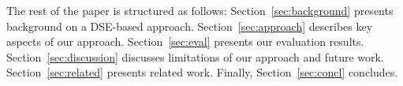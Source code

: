 The rest of the paper is structured as follows:
Section~\ref{sec:background} presents background on a DSE-based approach.
Section~\ref{sec:approach} describes key aspects of our approach.
Section~\ref{sec:eval} presents our evaluation results.
Section~\ref{sec:discussion} discusses limitations of our approach and future work.
Section~\ref{sec:related} presents related work.
Finally, Section~\ref{sec:concl} concludes. 





